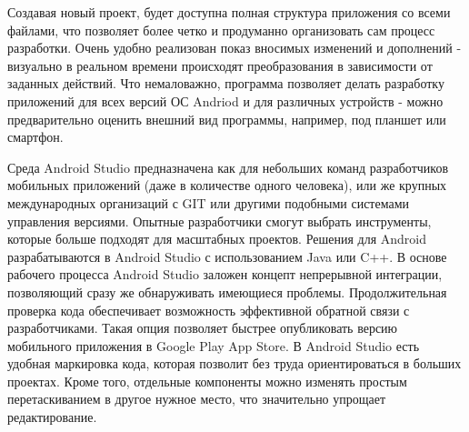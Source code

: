 Создавая новый проект, будет доступна полная структура приложения со всеми файлами, что позволяет более четко и продуманно организовать сам процесс разработки. Очень удобно реализован показ вносимых изменений и дополнений - визуально в реальном времени происходят преобразования в зависимости от заданных действий. Что немаловажно, программа позволяет делать разработку приложений для всех версий ОС Andriod и для различных устройств - можно предварительно оценить внешний вид программы, например, под планшет или смартфон.

Среда Android Studio предназначена как для небольших команд разработчиков мобильных приложений (даже в количестве одного человека), или же крупных международных организаций с GIT или другими подобными системами управления версиями. Опытные разработчики смогут выбрать инструменты, которые больше подходят для масштабных проектов. Решения для Android разрабатываются в Android Studio с использованием Java или C++. В основе рабочего процесса Android Studio заложен концепт непрерывной интеграции, позволяющий сразу же обнаруживать имеющиеся проблемы. Продолжительная проверка кода обеспечивает возможность эффективной обратной связи с разработчиками. Такая опция позволяет быстрее опубликовать версию мобильного приложения в Google Play App Store. В Android Studio есть удобная маркировка кода, которая позволит без труда ориентироваться в больших проектах. Кроме того, отдельные компоненты можно изменять простым перетаскиванием в другое нужное место, что значительно упрощает редактирование.

